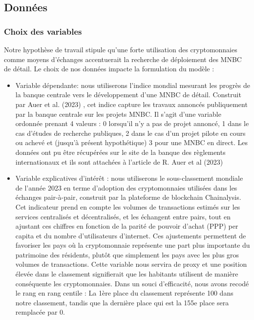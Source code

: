 \documentclass[12pt]{article}
\begin{document}
\subsection{Données}

\subsubsection{Choix des variables}
Notre hypothèse de travail stipule qu'une forte utilisation des cryptomonnaies comme moyens d'échanges accentuerait la recherche de déploiement des MNBC de détail. Le choix de nos données impacte la formulation du modèle : 
\begin{itemize}
    \item Variable dépendante: nous utiliserons l'indice mondial mesurant les progrès de la banque centrale vers le développement d’une MNBC de détail. Construit par Auer et al. (2023) \cite{RePEc:bis:biswps:880}, cet indice capture les travaux annoncés publiquement par la banque centrale sur les projets MNBC. Il s'agit d'une variable ordonnée prenant 4 valeurs : 0 lorsqu'il n'y a pas de projet annoncé, 1 dans le cas d'études de recherche publiques, 2 dans le cas d'un projet pilote en cours ou achevé et (jusqu'à présent hypothétique) 3 pour une MNBC en direct. Les données ont pu être récupérées sur le site de la banque des règlements internationaux et ils sont attachées à l'article de R. Auer et al (2023) \cite{RePEc:bis:biswps:880}
    \item Variable explicatives d'intérêt : nous utiliserons le sous-classement mondiale de l'année 2023 en terme d'adoption des cryptomonnaies utilisées dans les échanges pair-à-pair, construit par la plateforme de blockchain Chainalysis. Cet indicateur prend en compte les volumes de transactions estimés sur les services centralisés et décentralisés, et les échangent entre pairs, tout en ajustant ces chiffres en fonction de la parité de pouvoir d'achat (PPP) per capita et du nombre d'utilisateurs d'internet. Ces ajustements permettent de favoriser les pays où la cryptomonnaie représente une part plus importante du patrimoine des résidents, plutôt que simplement les pays avec les plus gros volumes de transactions. Cette variable nous servira de proxy et une position élevée dans le classement signifierait que les habitants utilisent de manière conséquente les cryptomonnaies. Dans un souci d'efficacité, nous avons recodé le rang en rang centile : La 1ère place du classement représente 100 dans notre classement, tandis que la dernière place qui est la 155e place sera remplacée par 0.

\end{itemize}
\end{document}
